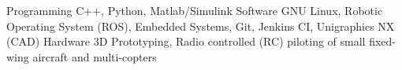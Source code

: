 
\vspace{-4pt}
\begin{cvskills}

\vspace{-4pt}
  \cvskill
    {Programming} %
    {C++, Python, Matlab/Simulink} %
    \vspace{-4pt}
  \cvskill
    {Software} %
    {GNU Linux, Robotic Operating System (ROS), Embedded Systems, Git, Jenkins CI, Unigraphics NX (CAD)} %
    \vspace{-4pt}
  \cvskill
    {Hardware}
    {3D Prototyping, Radio controlled (RC) piloting of small fixed-wing aircraft and multi-copters}


\end{cvskills}
